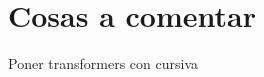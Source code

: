 \pagestyle{plain}

\section*{Cosas a comentar}


\begin{comment}
    \textsuperscript{\hyperref[ap:tfa]{A15}}
\end{comment}

\begin{atencion}
    Poner transformers con cursiva
\end{atencion}